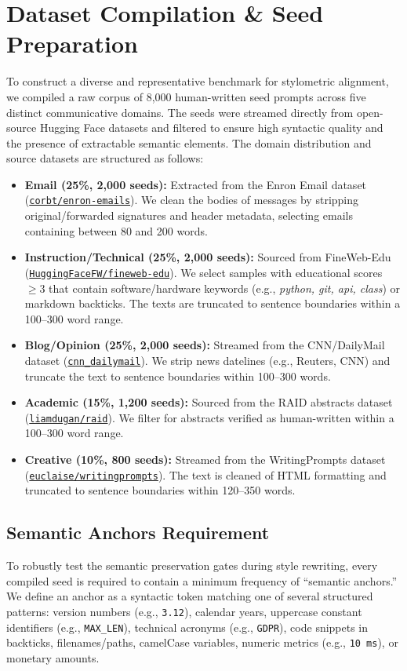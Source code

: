\documentclass{article}
\begin{document}
\section{Dataset Compilation \& Seed Preparation}
To construct a diverse and representative benchmark for stylometric alignment, we compiled a raw corpus of 8,000 human-written seed prompts across five distinct communicative domains. The seeds were streamed directly from open-source Hugging Face datasets and filtered to ensure high syntactic quality and the presence of extractable semantic elements. The domain distribution and source datasets are structured as follows:
\begin{itemize}
    \item \textbf{Email (25\%, 2,000 seeds):} Extracted from the Enron Email dataset (\href{https://huggingface.co/datasets/corbt/enron-emails}{\texttt{corbt/enron-emails}}). We clean the bodies of messages by stripping original/forwarded signatures and header metadata, selecting emails containing between 80 and 200 words.
    \item \textbf{Instruction/Technical (25\%, 2,000 seeds):} Sourced from FineWeb-Edu (\href{https://huggingface.co/datasets/HuggingFaceFW/fineweb-edu}{\texttt{HuggingFaceFW/fineweb-edu}}). We select samples with educational scores $\ge 3$ that contain software/hardware keywords (e.g., \textit{python, git, api, class}) or markdown backticks. The texts are truncated to sentence boundaries within a 100--300 word range.
    \item \textbf{Blog/Opinion (25\%, 2,000 seeds):} Streamed from the CNN/DailyMail dataset (\href{https://huggingface.co/datasets/cnn_dailymail}{\texttt{cnn\_dailymail}}). We strip news datelines (e.g., Reuters, CNN) and truncate the text to sentence boundaries within 100--300 words.
    \item \textbf{Academic (15\%, 1,200 seeds):} Sourced from the RAID abstracts dataset (\href{https://huggingface.co/datasets/liamdugan/raid}{\texttt{liamdugan/raid}}). We filter for abstracts verified as human-written within a 100--300 word range.
    \item \textbf{Creative (10\%, 800 seeds):} Streamed from the WritingPrompts dataset (\href{https://huggingface.co/datasets/euclaise/writingprompts}{\texttt{euclaise/writingprompts}}). The text is cleaned of HTML formatting and truncated to sentence boundaries within 120--350 words.
\end{itemize}

\subsection{Semantic Anchors Requirement}
To robustly test the semantic preservation gates during style rewriting, every compiled seed is required to contain a minimum frequency of ``semantic anchors.'' We define an anchor as a syntactic token matching one of several structured patterns: version numbers (e.g., \texttt{3.12}), calendar years, uppercase constant identifiers (e.g., \texttt{MAX\_LEN}), technical acronyms (e.g., \texttt{GDPR}), code snippets in backticks, filenames/paths, camelCase variables, numeric metrics (e.g., \texttt{10 ms}), or monetary amounts. 
\end{document}
